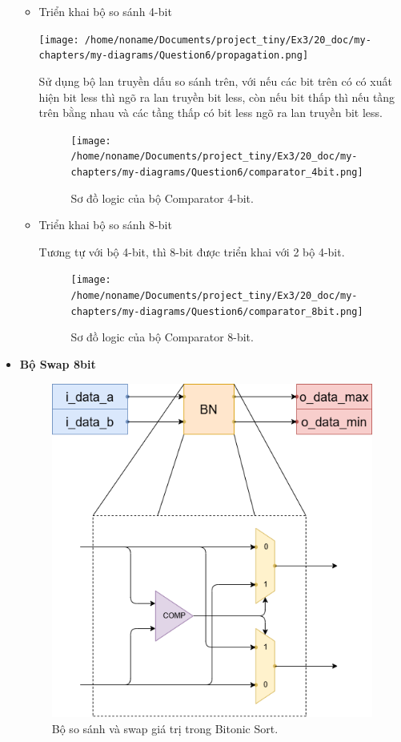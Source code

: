 \begin{itemize}[label=-]
\begin{itemize}[label=+]
		\item Triển khai bộ so sánh 4-bit
		
		\begin{minipage}{.4\linewidth}
			\texttt{[image: /home/noname/Documents/project\_tiny/Ex3/20\_doc/my-chapters/my-diagrams/Question6/propagation.png]}
		\end{minipage}
		\begin{minipage}{.4\linewidth}
			Sử dụng bộ lan truyền dấu so sánh trên, với nếu các bit trên có có xuất hiện bit less thì ngõ ra lan truyền bit less, còn nếu bit thấp thì nếu tầng trên bằng nhau và các tầng thấp có bit less ngõ ra lan truyền bit less.
		\end{minipage}
		
		\begin{figure}[H]
			\centering
			\texttt{[image: /home/noname/Documents/project\_tiny/Ex3/20\_doc/my-chapters/my-diagrams/Question6/comparator\_4bit.png]}
			\caption{Sơ đồ logic của bộ Comparator 4-bit.}
		\end{figure}
	
		\item Triển khai bộ so sánh 8-bit
		
		Tương tự với bộ 4-bit, thì 8-bit được triển khai với 2 bộ 4-bit.
		
		\begin{figure}[H]
			\centering
			\texttt{[image: /home/noname/Documents/project\_tiny/Ex3/20\_doc/my-chapters/my-diagrams/Question6/comparator\_8bit.png]}
			\caption{Sơ đồ logic của bộ Comparator 8-bit.}
		\end{figure}
	\end{itemize}

	\item \textbf{Bộ Swap 8bit}
	
	\begin{figure}[H]
		\centering
		\includegraphics[width=.4\linewidth]{./my-chapters/my-diagrams/Question6/Swap_and_compare.png}
		\caption{Bộ so sánh và swap giá trị trong Bitonic Sort.}
	\end{figure}


\end{itemize}
